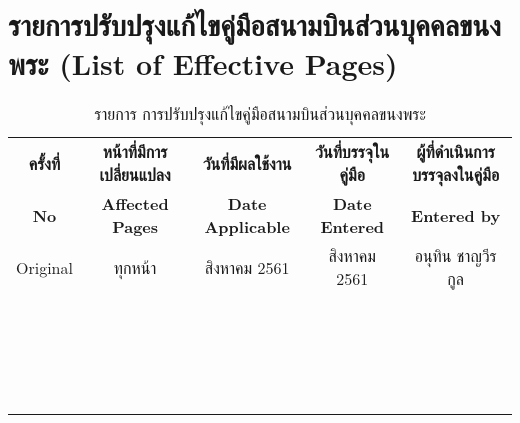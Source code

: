 
\chapter*{รายการปรับปรุงแก้ไขคู่มือสนามบินส่วนบุคคลขนงพระ (List of Effective Pages)}

\begin{table}[h!]
\caption{รายการ การปรับปรุงแก้ไขคู่มือสนามบินส่วนบุคคลขนงพระ}
\begin{center}
\begin{tabular}{|c|c|c|c|c|}
\hline
\textbf{ครั้งที่} & \textbf{หน้าที่มีการเปลี่ยนแปลง} & \textbf{วันที่มีผลใช้งาน} & \textbf{วันที่บรรจุในคู่มือ} & \textbf{ผู้ที่ดำเนินการบรรจุลงในคู่มือ} \\
\textbf{No} & \textbf{Affected Pages} & \textbf{Date Applicable} & \textbf{Date Entered} & \textbf{Entered by} \\ \hline
 Original & ทุกหน้า & สิงหาคม 2561 & สิงหาคม 2561 & อนุทิน ชาญวีรกูล \\ \hline
 & & & & \\ \hline
 & & & & \\ \hline
 & & & & \\ \hline
 & & & & \\ \hline
 & & & & \\ \hline
 & & & & \\ \hline
 && & & \\ \hline
 & & & & \\ \hline
 & & & & \\ \hline
 & & & & \\ \hline
 & & & & \\ \hline
 & & & & \\ \hline
 & & & & \\ \hline
 & & & & \\ \hline
 & & & & \\ \hline
 & & & & \\ \hline
 & & & & \\ \hline
& & & & \\ \hline
 & & & & \\ \hline
 & & & & \\ \hline
\end{tabular}
\end{center}
\label{รายการ การปรับปรุงแก้ไขคู่มือสนามบินส่วนบุคคลขนงพระ}
\end{table}%
